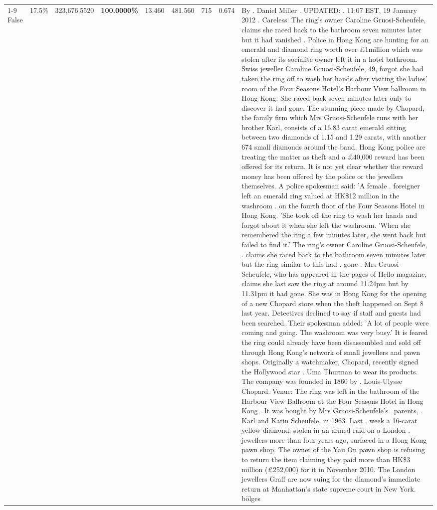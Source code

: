 \begin{table}[H]
\begin{tabular}{lllrlllll}
\cline{1-9}
False & 17.5\% & 323,676.5520 & \bfseries \color{red} 100.0000\% & 13.460 & 481.560 & 715 & 0.674 & By . Daniel Miller . UPDATED: . 11:07 EST, 19 January 2012 . Careless: The ring's owner Caroline Gruosi-Scheufele, claims she raced back to the bathroom seven minutes later but it had vanished . Police in Hong Kong are hunting for an emerald and diamond ring worth over £1million which was stolen after its socialite owner left it in a hotel bathroom. Swiss jeweller Caroline Gruosi-Scheufele, 49, forgot she had taken the ring off to wash her hands after visiting the ladies' room of the Four Seasons Hotel's Harbour View ballroom in Hong Kong. She raced back seven minutes later only to discover it had gone. The stunning piece made by Chopard, the family firm which Mrs Gruosi-Scheufele runs with her brother Karl, consists of a 16.83 carat emerald sitting between two diamonds of 1.15 and 1.29 carats, with another 674 small diamonds around the band. Hong Kong police are treating the matter as theft and a £40,000 reward has been offered for its return. It is not yet clear whether the reward money has been offered by the police or the jewellers themselves. A police spokesman said: 'A female . foreigner left an emerald ring valued at HK\$12 million in the washroom . on the fourth floor of the Four Seasons Hotel in Hong Kong. 'She took off the ring to wash her hands and forgot about it when she left the washroom. 'When she remembered the ring a few minutes later, she went back but failed to find it.' The ring's owner Caroline Gruosi-Scheufele, . claims she raced back to the bathroom seven minutes later but the ring similar to this had . gone . Mrs Gruosi-Scheufele, who has appeared in the pages of Hello magazine, claims she last saw the ring at around 11.24pm but by 11.31pm it had gone. She was in Hong Kong for the opening of a new Chopard store when the theft happened on Sept 8 last year. Detectives declined to say if staff and guests had been searched. Their spokesman added: 'A lot of people were coming and going. The washroom was very busy.' It is feared the ring could already have been disassembled and sold off through Hong Kong's network of small jewellers and pawn shops. Originally a watchmaker, Chopard, recently signed the Hollywood star . Uma Thurman to wear its products. The company was founded in 1860 by . Louis-Ulysse Chopard. Venue: The ring was left in the bathroom of the Harbour View Ballroom at the Four Seasons Hotel in Hong Kong . It was bought by Mrs Gruosi-Scheufele's  parents, . Karl and Karin Scheufele, in 1963. Last . week a 16-carat yellow diamond, stolen in an armed raid on a London . jewellers more than four years ago, surfaced in a Hong Kong pawn shop. The owner of the Yau On pawn shop is refusing to return the item claiming they paid more than HK\$3 million (£252,000) for it in November 2010. The London jewellers Graff are now suing for the diamond’s immediate return at Manhattan’s state supreme court in New York. bölges \\

\end{tabular}
\end{table}
